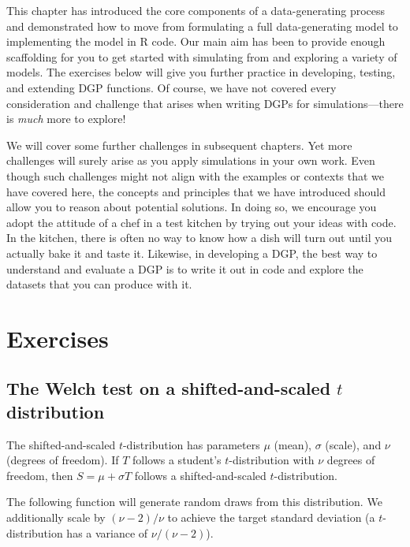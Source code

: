 \documentclass[
]{book}
\begin{document}
This chapter has introduced the core components of a data-generating process and demonstrated how to move from formulating a full data-generating model to implementing the model in R code.
Our main aim has been to provide enough scaffolding for you to get started with simulating from and exploring a variety of models.
The exercises below will give you further practice in developing, testing, and extending DGP functions.
Of course, we have not covered every consideration and challenge that arises when writing DGPs for simulations---there is \emph{much} more to explore!

We will cover some further challenges in subsequent chapters.
Yet more challenges will surely arise as you apply simulations in your own work.
Even though such challenges might not align with the examples or contexts that we have covered here, the concepts and principles that we have introduced should allow you to reason about potential solutions.
In doing so, we encourage you adopt the attitude of a chef in a test kitchen by trying out your ideas with code.
In the kitchen, there is often no way to know how a dish will turn out until you actually bake it and taste it.
Likewise, in developing a DGP, the best way to understand and evaluate a DGP is to write it out in code and explore the datasets that you can produce with it.

\section{Exercises}\label{exercises-3}

\subsection{\texorpdfstring{The Welch test on a shifted-and-scaled \(t\) distribution}{The Welch test on a shifted-and-scaled t distribution}}\label{Welch-t-dgp}

The shifted-and-scaled \(t\)-distribution has parameters \(\mu\) (mean), \(\sigma\) (scale), and \(\nu\) (degrees of freedom).
If \(T\) follows a student's \(t\)-distribution with \(\nu\) degrees of freedom, then \(S = \mu + \sigma T\) follows a shifted-and-scaled \(t\)-distribution.

The following function will generate random draws from this distribution.
We additionally scale by \((\nu-2)/\nu\) to achieve the target standard deviation (a \(t\)-distribution has a variance of \(\nu/(\nu-2)\)).
\end{document}
